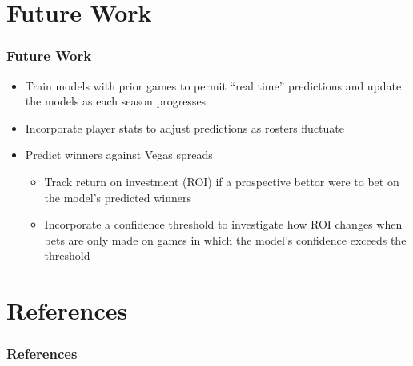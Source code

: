\documentclass{beamer}
\begin{document}
\section{Future Work}

\begin{frame}[t]
\frametitle{Future Work}
\begin{itemize}
    \item Train models with prior games to permit ``real time'' predictions and update the models as each season progresses
    \item Incorporate player stats to adjust predictions as rosters fluctuate
    \item Predict winners against Vegas spreads
    \begin{itemize}
        \item Track return on investment (ROI) if a prospective bettor were to bet on the model's predicted winners
        \item Incorporate a confidence threshold to investigate how ROI changes when bets are only made on games in which the model's confidence exceeds the threshold
    \end{itemize}
\end{itemize}
\end{frame}

\section{References}

\begin{frame}[t, allowframebreaks]
\frametitle{References}
\printbibliography
\end{frame}
\end{document}
